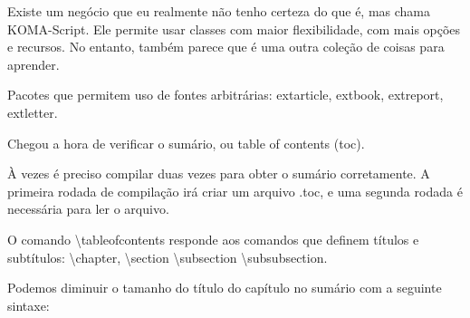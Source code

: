 \documentclass[a4paper, 12pts]{book}
\begin{document}
Existe um negócio que eu realmente não tenho certeza do que é, mas chama KOMA-Script.
Ele permite usar classes com maior flexibilidade, com mais opções e recursos.
No entanto, também parece que é uma outra coleção de coisas para aprender.

Pacotes que permitem uso de fontes arbitrárias:
extarticle, extbook, extreport, extletter.

Chegou a hora de verificar o sumário, ou table of contents (toc).


À vezes é preciso compilar duas vezes para obter o sumário corretamente.
A primeira rodada de compilação irá criar um arquivo .toc,
e uma segunda rodada é necessária para ler o arquivo.

O comando \textbackslash tableofcontents responde aos comandos que definem títulos e subtítulos:
\textbackslash chapter, \textbackslash section \textbackslash subsection \textbackslash subsubsection.

Podemos diminuir o tamanho do título do capítulo no sumário com a 
seguinte sintaxe:
\end{document}
